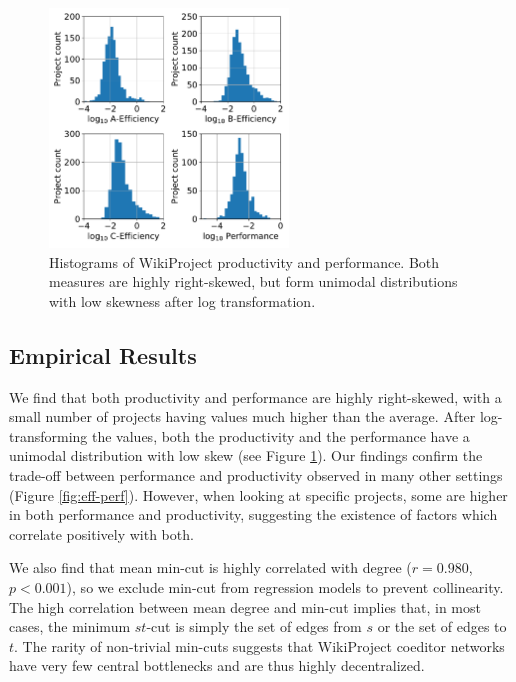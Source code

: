 \begin{figure}[t!]
\centering
\includegraphics[width=2.5in,height=2.5in]{fig/WPProdPerf/fig-eff-perf-hist.pdf}
\caption{
Histograms of WikiProject productivity and performance.
Both measures are highly right-skewed, but form unimodal distributions
with low skewness after log transformation.
\label{fig:eff-perf-hist}
}
\end{figure}

\subsection{Empirical Results}

We find that both productivity and performance are highly right-skewed,
with a small number of projects having values much higher than the average.
After log-transforming the values, both the productivity and the performance have
a unimodal distribution with low skew (see Figure \ref{fig:eff-perf-hist}).
Our findings confirm the trade-off between performance and productivity
observed in many other settings (Figure \ref{fig:eff-perf}).
However, when looking at specific projects, some are higher in both performance
and productivity,
suggesting the existence of factors which correlate positively with both.

We also find that mean min-cut is highly correlated with degree ($r=0.980$, $p<0.001$),
so we exclude min-cut from regression models to prevent collinearity.
The high correlation between mean degree and min-cut implies that,
in most cases,
the minimum $st$-cut is simply the set of edges from $s$
or the set of edges to $t$.
The rarity of non-trivial min-cuts suggests that WikiProject coeditor
networks have very few central
bottlenecks and are thus highly decentralized.

